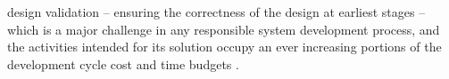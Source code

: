 \documentclass[journal]{IEEEtran}
\begin{document}
% 
%
%
design validation -- ensuring the correctness of the design at earliest stages -- which is a major challenge in any responsible system development process, and the activities intended for its solution occupy an ever increasing portions of the  development cycle cost and time budgets \cite{ClarkeHV18}. 
\end{document}
